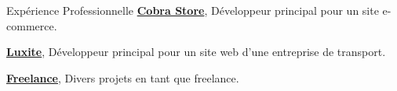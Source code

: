 \begin{rubric}{Expérience Professionnelle}
    \entry*[08/2023 -- 11/2023]%
    \textbf{\href{https://cobra-store.vercel.app}{Cobra Store}}, Développeur principal pour un site e-commerce.

    \entry*[07/2023 -- 08/2023]%
    \textbf{\href{https://luxite.us}{Luxite}}, Développeur principal pour un site web d'une entreprise de transport.

    \entry*[08/2021 -- Présent]%
    \textbf{\href{https://github.com/raideno}{Freelance}}, Divers projets en tant que freelance.
\end{rubric}
